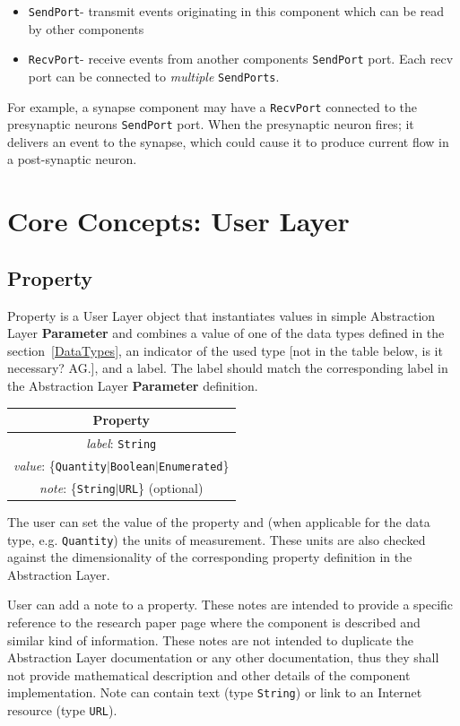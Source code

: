 \documentclass{article}
\newcommand{\Parameter}{{\bf{Parameter}}\xspace}
\newcommand{\SendPort}{{\tt{SendPort}}\xspace}
\newcommand{\RecvPort}{{\tt{RecvPort}}\xspace}
\newcommand{\SendPorts}{{\tt{SendPorts}}\xspace}
\begin{document}
\begin{itemize}
\item \SendPort - transmit events originating in this component which can be read by
other components
\item \RecvPort - receive events from another components \SendPort port.
Each recv port can be connected to \emph{multiple} \SendPorts.
\end{itemize}

For example, a synapse component may have a \RecvPort connected to the
presynaptic neurons \SendPort port. When the presynaptic neuron fires;
it delivers an event to the synapse, which could cause it to produce current
flow in a post-synaptic neuron.

\section{Core Concepts: User Layer}
\label{AbstractionL}

\subsection{Property}

Property is a User Layer object that instantiates values in simple
Abstraction Layer \Parameter and combines a value of one of the data
types defined in the section~\ref{DataTypes}, an indicator of the used type
[not in the table below, is it necessary? AG.],
and a label. The label should match the corresponding label in the
Abstraction Layer \Parameter definition.

\begin{table}[htb]
\center
\begin{tabular}{|c|}
\hline
\hline
Property \\
\hline
\hline
{\em label}: {\tt String} \\
\hline
{\em value}: \{{\tt Quantity}$|${\tt Boolean}$|${\tt Enumerated}\} \\
\hline
{\em note}: \{{\tt String}$|${\tt URL}\} (optional)\\
\hline
\end{tabular}
\end{table}

The user can set the value of the property and (when applicable for the data
type, e.g. {\tt Quantity}) the units of measurement. These units are also
checked against the dimensionality of the corresponding property definition
in the Abstraction Layer.

User can add a note to a property. These notes are
intended to provide a specific reference to the research paper page
where the component is described and similar kind of information. These
notes are not intended to duplicate the Abstraction Layer documentation
or any other documentation, thus they shall not provide mathematical
description and other details of the component implementation. Note can
contain text (type {\tt String}) or link to an Internet resource (type
{\tt URL}).
\end{document}
